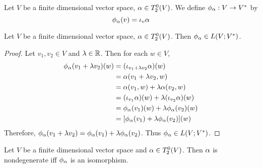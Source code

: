 \documentclass{book}
\begin{document}
	\begin{defn}
		Let $V$ be a finite dimensional vector space, $\alpha \in T^0_2(V)$. We define $\phi_{\alpha}: V \rightarrow V^*$ by 
		$$ \phi_{\alpha}(v) = \iota_v \alpha $$
	\end{defn}	

	\begin{ex}
		Let $V$ be a finite dimensional vector space, $\alpha \in T^0_2(V)$. Then $\phi_{\alpha} \in L(V;V^*)$.
	\end{ex}

	\begin{proof}
		Let $v_1, v_2 \in V$ and $\lambda \in \mathbb{R}$. Then for each $w \in V$,
		\begin{align*}
			\phi_{\alpha}(v_1 + \lambda v_2) (w)
			& = (\iota_{v_1 + \lambda v_2} \alpha) (w) \\
			& = \alpha (v_1 + \lambda v_2, w) \\
			& = \alpha(v_1, w) + \lambda \alpha(v_2, w) \\
			& = (\iota_{v_1} \alpha) (w) + \lambda (\iota_{v_2} \alpha) (w) \\
			& = \phi_{\alpha}(v_1)(w) + \lambda \phi_{\alpha}(v_2)(w) \\
			& = [\phi_{\alpha}(v_1) + \lambda \phi_{\alpha}(v_2)](w)
		\end{align*}
		Therefore, $\phi_{\alpha}(v_1 + \lambda v_2) = \phi_{\alpha}(v_1) + \lambda \phi_{\alpha}(v_2)$. Thus $\phi_{\alpha} \in L(V; V^*)$.
	\end{proof}

	\begin{ex}
		Let $V$ be a finite dimensional vector space and $\alpha \in T^0_2(V)$. Then $\alpha$ is nondegenerate iff $\phi_{\alpha}$ is an isomorphism. 
	\end{ex}
\end{document}
